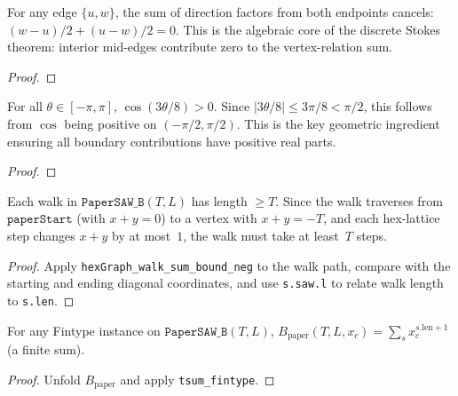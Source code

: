 \begin{theorem}\label{thm:interior_cancel}
\leanok
{}
  For any edge $\{u,w\}$, the sum of direction factors from both endpoints
  cancels: $(w-u)/2 + (u-w)/2 = 0$.  This is the algebraic core of the
  discrete Stokes theorem: interior mid-edges contribute zero to the
  vertex-relation sum.
\end{theorem}
\begin{proof}
\leanok
\end{proof}

\begin{lemma}\label{lem:boundary_cos}
\leanok
  For all $\theta \in [-\pi,\pi]$, $\cos(3\theta/8) > 0$.
  Since $|3\theta/8| \le 3\pi/8 < \pi/2$, this follows from
  $\cos$ being positive on $(-\pi/2,\pi/2)$.
  This is the key geometric ingredient ensuring all boundary
  contributions have positive real parts.
\end{lemma}
\begin{proof}
\leanok
\end{proof}

\begin{lemma}\label{lem:paper_saw_b_length}
\leanok
{}
  Each walk in $\texttt{PaperSAW\_B}(T,L)$ has length $\geq T$.
  Since the walk traverses from $\texttt{paperStart}$ (with $x+y=0$) to
  a vertex with $x+y = -T$, and each hex-lattice step changes $x+y$
  by at most~$1$, the walk must take at least~$T$ steps.
\end{lemma}
\begin{proof}
\leanok
{}
  Apply \texttt{hexGraph\_walk\_sum\_bound\_neg} to the walk path,
  compare with the starting and ending diagonal coordinates,
  and use \texttt{s.saw.l} to relate walk length to \texttt{s.len}.
\end{proof}

\begin{lemma}\label{lem:B_paper_fintype}
\leanok
{}
  For any Fintype instance on $\texttt{PaperSAW\_B}(T,L)$,
  $B_{\text{paper}}(T,L,x_c) = \sum_s x_c^{s.\text{len}+1}$ (a finite sum).
\end{lemma}
\begin{proof}
\leanok
  Unfold $B_{\text{paper}}$ and apply \texttt{tsum\_fintype}.
\end{proof}

